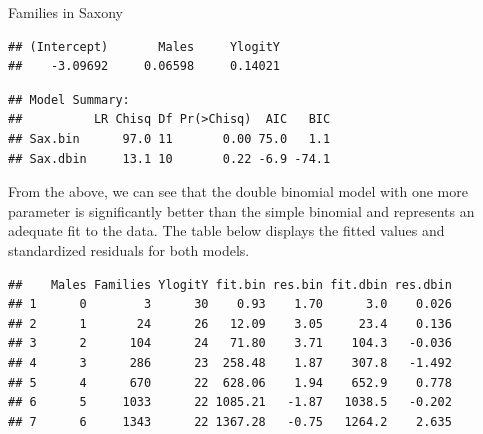 \documentclass[11pt]{book}
\renewenvironment{knitrout}{\small\renewcommand{\baselinestretch}{.85}}{} %
\begin{document}
\begin{Example}[saxony2]{Families in Saxony}
\begin{knitrout}
\begin{kframe}
\begin{alltt}
 \hlkwb{<-}  \hlopt{~}  \hlopt{+}  \hlstd{=}\hlstd{(}\hlstd{,}\hlopt{:}\hlstd{),}
         
\end{alltt}
\begin{verbatim}
## (Intercept)       Males     YlogitY 
##    -3.09692     0.06598     0.14021
\end{verbatim}
\begin{alltt}
\hlstd{(}
\end{alltt}
\begin{verbatim}
## Model Summary:
##          LR Chisq Df Pr(>Chisq)  AIC   BIC
## Sax.bin      97.0 11       0.00 75.0   1.1
## Sax.dbin     13.1 10       0.22 -6.9 -74.1
\end{verbatim}
\end{kframe}
\end{knitrout}
From the above, we can see that 
the double binomial model  with one more parameter
is significantly better than the simple binomial
and represents an adequate fit to the data.  The table below
displays the fitted values and standardized residuals for both models.
\begin{knitrout}
\color{fgcolor}\begin{kframe}
\begin{alltt}
 \hlkwb{<-} 
          \hlstd{=} \hlstd{=}
          \hlstd{=} \hlstd{=}
 \hlstd{=}\hlstd{)}
\end{alltt}
\begin{verbatim}
##    Males Families YlogitY fit.bin res.bin fit.dbin res.dbin
## 1      0        3      30    0.93    1.70      3.0    0.026
## 2      1       24      26   12.09    3.05     23.4    0.136
## 3      2      104      24   71.80    3.71    104.3   -0.036
## 4      3      286      23  258.48    1.87    307.8   -1.492
## 5      4      670      22  628.06    1.94    652.9    0.778
## 6      5     1033      22 1085.21   -1.87   1038.5   -0.202
## 7      6     1343      22 1367.28   -0.75   1264.2    2.635

\end{verbatim}
\end{kframe}
\end{knitrout}
\end{Example}
\end{document}

